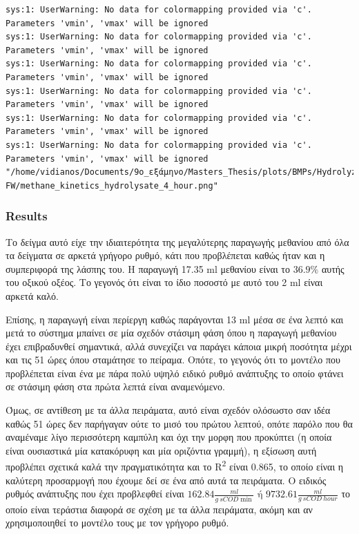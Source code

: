 \documentclass[11pt]{article}
\begin{document}
\begin{verbatim}
sys:1: UserWarning: No data for colormapping provided via 'c'. Parameters 'vmin', 'vmax' will be ignored
sys:1: UserWarning: No data for colormapping provided via 'c'. Parameters 'vmin', 'vmax' will be ignored
sys:1: UserWarning: No data for colormapping provided via 'c'. Parameters 'vmin', 'vmax' will be ignored
sys:1: UserWarning: No data for colormapping provided via 'c'. Parameters 'vmin', 'vmax' will be ignored
sys:1: UserWarning: No data for colormapping provided via 'c'. Parameters 'vmin', 'vmax' will be ignored
sys:1: UserWarning: No data for colormapping provided via 'c'. Parameters 'vmin', 'vmax' will be ignored
"/home/vidianos/Documents/9o_εξάμηνο/Masters_Thesis/plots/BMPs/Hydrolyzed FW/methane_kinetics_hydrolysate_4_hour.png"
\end{verbatim}

\subsubsection{Results}
\label{sec:org452e8ec}
Το δείγμα αυτό είχε την ιδιαιτερότητα της μεγαλύτερης παραγωγής μεθανίου από όλα τα δείγματα σε αρκετά γρήγορο ρυθμό, κάτι που προβλέπεται καθώς ήταν και η συμπεριφορά της λάσπης του. Η παραγωγή 17.35 ml μεθανίου είναι το \(36.9 \%\) αυτής του οξικού οξέος. Το γεγονός ότι είναι το ίδιο ποσοστό με αυτό του 2 ml είναι αρκετά καλό.

Επίσης, η παραγωγή είναι περίεργη καθώς παράγονται 13 ml μέσα σε ένα λεπτό και μετά το σύστημα μπαίνει σε μία σχεδόν στάσιμη φάση όπου η παραγωγή μεθανίου έχει επιβραδυνθεί σημαντικά, αλλά συνεχίζει να παράγει κάποια μικρή ποσότητα μέχρι και τις 51 ώρες όπου σταμάτησε το πείραμα. Οπότε, το γεγονός ότι το μοντέλο που προβλέπεται είναι ένα με πάρα πολύ υψηλό ειδικό ρυθμό ανάπτυξης το οποίο φτάνει σε στάσιμη φάση στα πρώτα λεπτά είναι αναμενόμενο.

Όμως, σε αντίθεση με τα άλλα πειράματα, αυτό είναι σχεδόν ολόσωστο σαν ιδέα καθώς 51 ώρες δεν παρήγαγαν ούτε το μισό του πρώτου λεπτού, οπότε παρόλο που θα αναμέναμε λίγο περισσότερη καμπύλη και όχι την μορφη που προκύπτει (η οποία είναι ουσιαστικά μία κατακόρυφη και μία οριζόντια γραμμή), η εξίσωση αυτή προβλέπει σχετικά καλά την πραγματικότητα και το R\textsuperscript{2} είναι 0.865, το οποίο είναι η καλύτερη προσαρμογή που έχουμε δεί σε ένα από αυτά τα πειράματα. Ο ειδικός ρυθμός ανάπτυξης που έχει προβλεφθεί είναι \(162.84 \frac{ml}{g ~ sCOD \min } \text{ ή } 9732.61 \frac{ml}{g ~ sCOD ~ hour}\) το οποίο είναι τεράστια διαφορά σε σχέση με τα άλλα πειράματα, ακόμη και αν χρησιμοποιηθεί το μοντέλο τους με τον γρήγορο ρυθμό.
\end{document}
